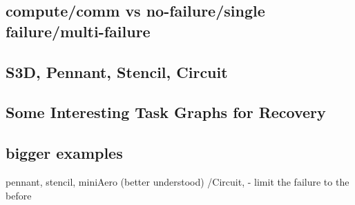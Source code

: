 \subsection{compute/comm vs no-failure/single failure/multi-failure}

\subsection{S3D, Pennant, Stencil, Circuit}

\subsection{Some Interesting Task Graphs for Recovery}

\subsection{bigger examples}
pennant, stencil, miniAero (better understood) /Circuit, 
- limit the failure to the before


